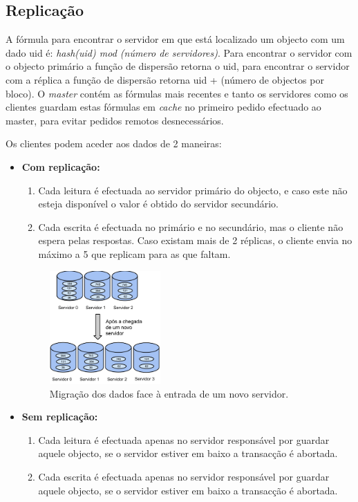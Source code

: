 \subsection{Replicação}

A fórmula para encontrar o servidor em que está localizado um objecto com um dado uid é: \textit{hash(uid) mod (número de servidores)}. Para encontrar o servidor com o objecto primário a função de dispersão retorna o uid, para encontrar o servidor com a réplica a função de dispersão retorna uid + (número de objectos por bloco).
O \textit{master} contém as fórmulas mais recentes e tanto os servidores como os clientes guardam estas fórmulas em \textit{cache} no primeiro pedido efectuado ao master, para evitar pedidos remotos desnecessários.

Os clientes podem aceder aos dados de 2 maneiras:

\begin{itemize}
\item \textbf{Com replicação:} 

\begin{enumerate}
\item Cada leitura é efectuada ao servidor primário do objecto, e caso este não esteja disponível o valor é obtido do servidor secundário.

\item Cada escrita é efectuada no primário e no secundário, mas o cliente não espera pelas respostas. Caso existam mais de 2 réplicas, o cliente envia no máximo a 5 que replicam para as que faltam.
\end{enumerate}

\begin{figure}
\centering
\includegraphics[width=0.4\textwidth]{migracao.png}
\caption{\label{fig:migracao}Migração dos dados face à entrada de um novo servidor.}
\end{figure}

\item \textbf{Sem replicação:}

\begin{enumerate}
\item Cada leitura é efectuada apenas no servidor responsável por guardar aquele objecto, se o servidor estiver em baixo a transacção é abortada.

\item Cada escrita é efectuada apenas no servidor responsável por guardar aquele objecto, se o servidor estiver em baixo a transacção é abortada.
\end{enumerate}
\end{itemize}